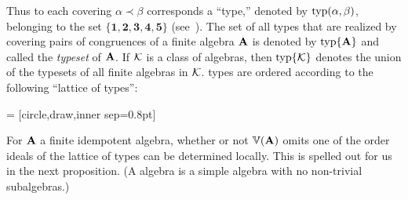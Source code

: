 \documentclass{ws-ijac}
\begin{document}
Thus to each covering $\alpha \prec \beta$
corresponds a ``\tct type,'' denoted by $\operatorname{typ}(\alpha, \beta)$,
belonging to the set
$\{\mathbf{1},\mathbf{2},\mathbf{3},\mathbf{4},\mathbf{5}\}$
(see~\cite[Def.~5.1]{HM:1988}).
The set of all \tct types that are realized by covering pairs of congruences of a
finite algebra $\mathbf{A}$ is denoted by $\operatorname{typ}\{\mathbf{A}\}$
and called the \emph{typeset} of $\mathbf{A}$.
If $\mathcal{K}$ is a class of algebras, then $\operatorname{typ}\{\mathcal{K}\}$ denotes the union of the typesets of all finite algebras in $\mathcal{K}$.
\tct types are ordered according to the following ``lattice of types'':

\newcommand{\dotsize}{0.8pt}
 = [circle,draw,inner sep=\dotsize]
\begin{center}
\newcommand{\figscale}{.7}
\end{center}
For $\mathbf{A}$ a finite idempotent algebra, whether or not $\operatorname{\mathbb{V}}(\mathbf{A})$ omits one of the order ideals of the lattice of types can be
determined locally.  This is spelled out for us in the next proposition.
(A  algebra is a simple
algebra with no non-trivial subalgebras.)
\end{document}
